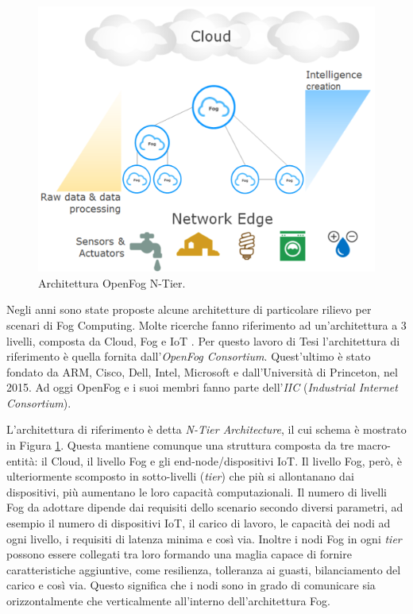 \begin{figure}[!ht]
  \includegraphics[width=12cm]{images/FogCloudToThingContinuum}
  \centering
  \caption[Architettura OpenFog N-Tier]{Architettura OpenFog N-Tier. \cite{OpenFogReferenceArchitecture}}
  \label{fig:ntier_architecture}
\end{figure}

Negli anni sono state proposte alcune architetture di particolare rilievo per scenari di Fog Computing. Molte ricerche fanno riferimento ad un'architettura a 3 livelli, composta da Cloud, Fog e IoT \cite{ThreeLevelArchitecture}. Per questo lavoro di Tesi l'architettura di riferimento è quella fornita dall'\textit{OpenFog Consortium}. Quest'ultimo è stato fondato da ARM, Cisco, Dell, Intel, Microsoft e dall'Università di Princeton, nel 2015. Ad oggi OpenFog e i suoi membri fanno parte dell'\textit{IIC} (\textit{Industrial Internet Consortium}). 

L'architettura di riferimento è detta \textit{N-Tier Architecture}, il cui schema è mostrato in Figura \ref{fig:ntier_architecture}. Questa mantiene comunque una struttura composta da tre macro-entità: il Cloud, il livello Fog e gli end-node/dispositivi IoT. Il livello Fog, però, è ulteriormente scomposto in sotto-livelli (\textit{tier}) che più si allontanano dai dispositivi, più aumentano le loro capacità computazionali. Il numero di livelli Fog da adottare dipende dai requisiti dello scenario secondo diversi parametri, ad esempio il numero di dispositivi IoT, il carico di lavoro, le capacità dei nodi ad ogni livello, i requisiti di latenza minima e così via. Inoltre i nodi Fog in ogni \textit{tier} possono essere collegati tra loro formando una maglia capace di fornire caratteristiche aggiuntive, come resilienza, tolleranza ai guasti, bilanciamento del carico e così via. Questo significa che i nodi sono in grado di comunicare sia orizzontalmente che verticalmente all'interno dell'architettura Fog.

